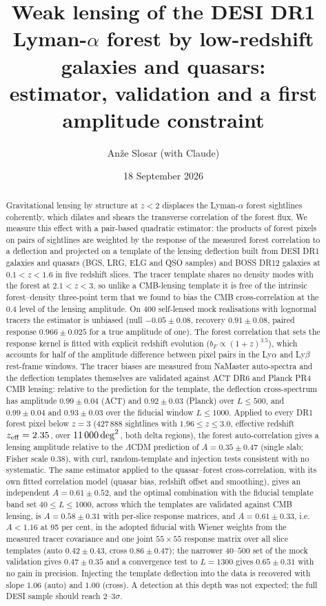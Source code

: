 \documentclass[11pt,a4paper]{article}
\title{Weak lensing of the DESI DR1 Lyman-$\alpha$ forest by low-redshift galaxies and quasars:\\ estimator, validation and a first amplitude constraint}
\author{An\v{z}e Slosar (with Claude)}
\date{18 September 2026}
\begin{document}
\maketitle

\begin{abstract}
Gravitational lensing by structure at $z<2$ displaces the Lyman-$\alpha$ forest sightlines coherently, which dilates and shears the transverse correlation of the forest flux. We measure this effect with a pair-based quadratic estimator: the products of forest pixels on pairs of sightlines are weighted by the response of the measured forest correlation to a deflection and projected on a template of the lensing deflection built from DESI DR1 galaxies and quasars (BGS, LRG, ELG and QSO samples) and BOSS DR12 galaxies at $0.1<z<1.6$ in five redshift slices. The tracer template shares no density modes with the forest at $2.1<z<3$, so unlike a CMB-lensing template it is free of the intrinsic forest--density three-point term that we found to bias the CMB cross-correlation at the $0.4$ level of the lensing amplitude. On 400 self-lensed mock realisations with lognormal tracers the estimator is unbiased (null $-0.05\pm0.08$, recovery $0.91\pm0.08$, paired response $0.966\pm0.025$ for a true amplitude of one). The forest correlation that sets the response kernel is fitted with explicit redshift evolution ($b_F\propto(1+z)^{3.5}$), which accounts for half of the amplitude difference between pixel pairs in the Ly$\alpha$ and Ly$\beta$ rest-frame windows. The tracer biases are measured from NaMaster auto-spectra and the deflection templates themselves are validated against ACT DR6 and Planck PR4 CMB lensing: relative to the prediction for the template, the deflection cross-spectrum has amplitude $0.99\pm0.04$ (ACT) and $0.92\pm0.03$ (Planck) over $L\le500$, and $0.99\pm0.04$ and $0.93\pm0.03$ over the fiducial window $L\le1000$. Applied to every DR1 forest pixel below $z=3$ (427\,888 sightlines with $1.96\le z\le3.0$, effective redshift $z_{\rm eff}=2.35$, over $11\,000\,{\rm deg}^2$, both delta regions), the forest auto-correlation gives a lensing amplitude relative to the $\Lambda$CDM prediction of $A=0.35\pm0.47$ (single slab; Fisher scale 0.38), with curl, random-template and injection tests consistent with no systematic. The same estimator applied to the quasar--forest cross-correlation, with its own fitted correlation model (quasar bias, redshift offset and smoothing), gives an independent $A=0.61\pm0.52$, and the optimal combination with the fiducial template band set $40\le L\le1000$, across which the templates are validated against CMB lensing, is $A=0.58\pm0.31$ with per-slice response matrices, and $A=0.61\pm0.33$, i.e. $A<1.16$ at 95 per cent, in the adopted fiducial with Wiener weights from the measured tracer covariance and one joint $55\times55$ response matrix over all slice templates (auto $0.42\pm0.43$, cross $0.86\pm0.47$); the narrower $40$--$500$ set of the mock validation gives $0.47\pm0.35$ and a convergence test to $L=1300$ gives $0.65\pm0.31$ with no gain in precision. Injecting the template deflection into the data is recovered with slope $1.06$ (auto) and $1.00$ (cross). A detection at this depth was not expected; the full DESI sample should reach $2$--$3\sigma$.
\end{abstract}
\end{document}
